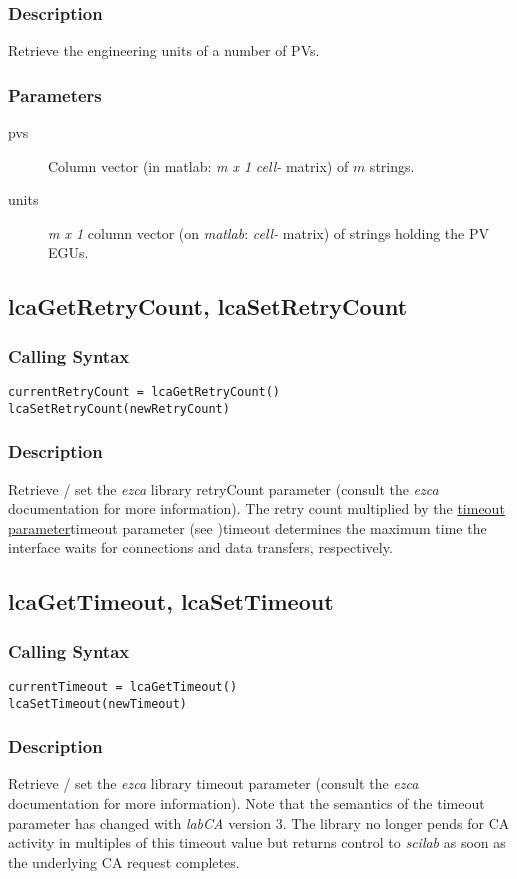 \documentclass{article}
\newcommand{\sca}{\ita{labCA}}
\newcommand{\scilab}{\ita{scilab}}
\newcommand{\matlab}{\ita{matlab}}
\newcommand{\ezca}{\ita{ezca}}
\newcommand{\pbrk}{\pagebreak[3]}
\newcommand{\ita}[1]{\emph{#1}}
\newcommand{\m}{$m$}
\newcommand{\mhack}{$m$} %
\newcommand{\mxl}{$m\times 1$}
\renewcommand{\m}{\ita{m}}
\newcommand{\mhack}{\ita{m}} %
\renewcommand{\mxl}{\ita{m x 1}}
\renewcommand{\pbrk}{}
\newcommand{\PVITEM}{
\item[pvs] Column vector (in matlab: \mxl{} \ita{cell-} matrix)
of \mhack{} strings.
}
\begin{document}
\subsubsection{Description}
Retrieve the engineering units of a number of PVs.
\subsubsection{Parameters}
\begin{description}
\PVITEM
\item[units] \mxl{} column vector (on \matlab: \ita{cell-} matrix)
of strings holding the PV EGUs.
\end{description}

\vspace*{\fill}
\pbrk
\subsection{lcaGetRetryCount, lcaSetRetryCount}
\label{retrycnt}
\subsubsection{Calling Syntax}
\begin{verbatim}
currentRetryCount = lcaGetRetryCount()
lcaSetRetryCount(newRetryCount)
\end{verbatim}
\subsubsection{Description}
Retrieve / set the \ezca{} library retryCount parameter (consult the \ezca{}
documentation for more information). The retry count multiplied by the
\hyperref[ref]{timeout parameter}{timeout parameter (see }{ )}{timeout}
determines the maximum time the interface waits for connections and data
transfers, respectively.

\vspace*{\fill}
\pbrk
\subsection{lcaGetTimeout, lcaSetTimeout}
\label{timeout}
\subsubsection{Calling Syntax}
\begin{verbatim}
currentTimeout = lcaGetTimeout()
lcaSetTimeout(newTimeout)
\end{verbatim}
\subsubsection{Description}
Retrieve / set the \ezca{} library timeout parameter (consult the \ezca{}
documentation for more information). Note that the semantics of the
timeout parameter has changed with \sca{} version 3. The library no longer
pends for CA activity in multiples of this timeout value but returns
control to \scilab{} as soon as the underlying CA request completes.
\end{document}
